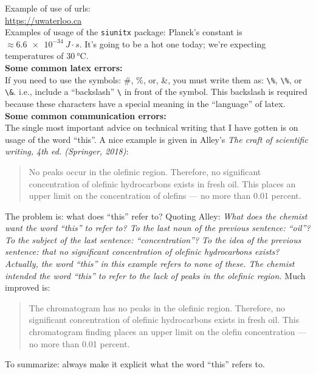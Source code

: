 \documentclass[11pt,usenames,dvipsnames]{article}
\begin{document}
\noindent
Example of use of urls: \\ \url{https://uwaterloo.ca}\\

\noindent
Examples of usage of the \verb$siunitx$ package: Planck's constant is $ \approx \SI{6.6e-34}{J \cdot s}$.  It's going to be a hot one today; we're expecting temperatures of $\SI{30}{\celsius}$.\\

\noindent
{\bf Some common latex errors:}\\

\noindent
If you need to use the symbols: \#, \%, or, \&, you must write them as: \verb$\%$, \verb$\%$, or \verb$\&$.  i.e., include a ``backslash'' \verb$\$ in front of the symbol.  This backslash is required because these characters have a special meaning in the ``language'' of latex.\\

\noindent
{\bf Some common communication errors:}\\

\noindent
The single most important advice on technical writing that I have gotten is on usage of the word ``this''.  A nice example is given in Alley's {\em The craft of scientific writing, 4th ed. (Springer, 2018)}:
\begin{quotation}
No peaks occur in the olefinic region. Therefore, no significant concentration of olefinic hydrocarbons exists in fresh oil. This places an upper limit on the concentration of olefins --- no more than 0.01 percent.
\end{quotation}
The problem is: what does ``this'' refer to?  Quoting Alley: \textit{What does the chemist want the word ``this'' to refer to? To the last noun of the previous sentence: ``oil''? To the subject of the last sentence: ``concentration''? To the idea of the previous sentence: that no significant concentration of olefinic hydrocarbons exists? Actually, the word ``this'' in this example refers to none of these. The chemist intended the word ``this'' to refer to the lack of peaks in the olefinic region.}
Much improved is:
\begin{quotation}
The chromatogram has no peaks in the olefinic region. Therefore, no significant concentration of olefinic hydrocarbons exists in fresh oil. This chromatogram finding places an upper limit on the olefin concentration --- no more than 0.01 percent.
\end{quotation}
To summarize: always make it explicit what the word ``this'' refers to.

\end{document}
